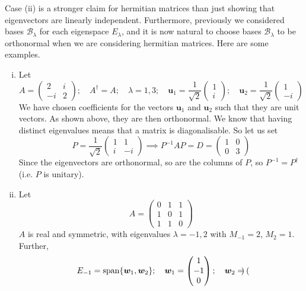 \documentclass{article}
\begin{document}
Case (ii) is a stronger claim for hermitian matrices than just showing that eigenvectors are linearly independent. Furthermore, previously we considered bases $\mathcal B_\lambda$ for each eigenspace $E_\lambda$, and it is now natural to choose bases $\mathcal B_\lambda$ to be orthonormal when we are considering hermitian matrices. Here are some examples.
\begin{enumerate}[(i)]
	\item Let
	      \[ A = \begin{pmatrix}
			      2 & i \\ -i & 2
		      \end{pmatrix};\quad A^\dagger = A;\quad \lambda = 1, 3;\quad\bm u_1 = \frac{1}{\sqrt{2}} \begin{pmatrix}
			      1 \\i
		      \end{pmatrix};\quad\bm u_2 = \frac{1}{\sqrt{2}} \begin{pmatrix}
			      1 \\-i
		      \end{pmatrix} \]
	      We have chosen coefficients for the vectors $\bm u_1$ and $\bm u_2$ such that they are unit vectors. As shown above, they are then orthonormal. We know that having distinct eigenvalues means that a matrix is diagonalisable. So let us set
	      \[ P =  \frac{1}{\sqrt{2}} \begin{pmatrix}
			      1 & 1 \\ i & -i
		      \end{pmatrix} \implies P^{-1}AP = D = \begin{pmatrix}
			      1 & 0 \\ 0 & 3
		      \end{pmatrix} \]
	      Since the eigenvectors are orthonormal, so are the columns of $P$, so $P^{-1} = P^\dagger$ (i.e. $P$ is unitary).
	\item Let
	      \[ A = \begin{pmatrix}
			      0 & 1 & 1 \\ 1 & 0 & 1 \\ 1 & 1 & 0
		      \end{pmatrix} \]
	      $A$ is real and symmetric, with eigenvalues $\lambda = -1, 2$ with $M_{-1} = 2$, $M_2 = 1$. Further,
	      \[ E_{-1} = \operatorname{span} \{ \bm w_1, \bm w_2 \};\quad \bm w_1 = \begin{pmatrix}
			      1 \\ -1 \\ 0
		      \end{pmatrix};\quad \bm w_2 = \begin{pmatrix}

\end{pmatrix}\]
\end{enumerate}
\end{document}
